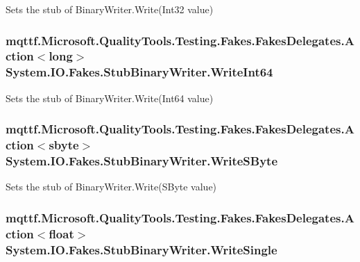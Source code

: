 Sets the stub of Binary\-Writer.\-Write(\-Int32 value)

\hypertarget{class_system_1_1_i_o_1_1_fakes_1_1_stub_binary_writer_a3ed5423f719f063820fe9f74170dd34f}{
\subsubsection[{Write\-Int64}]{\setlength{\rightskip}{0pt plus 5cm}mqttf.\-Microsoft.\-Quality\-Tools.\-Testing.\-Fakes.\-Fakes\-Delegates.\-Action$<$long$>$ System.\-I\-O.\-Fakes.\-Stub\-Binary\-Writer.\-Write\-Int64}}\label{class_system_1_1_i_o_1_1_fakes_1_1_stub_binary_writer_a3ed5423f719f063820fe9f74170dd34f}


Sets the stub of Binary\-Writer.\-Write(\-Int64 value)

\hypertarget{class_system_1_1_i_o_1_1_fakes_1_1_stub_binary_writer_a7ff1223f92522dd42e32fb2ef3104e25}{
\subsubsection[{Write\-S\-Byte}]{\setlength{\rightskip}{0pt plus 5cm}mqttf.\-Microsoft.\-Quality\-Tools.\-Testing.\-Fakes.\-Fakes\-Delegates.\-Action$<$sbyte$>$ System.\-I\-O.\-Fakes.\-Stub\-Binary\-Writer.\-Write\-S\-Byte}}\label{class_system_1_1_i_o_1_1_fakes_1_1_stub_binary_writer_a7ff1223f92522dd42e32fb2ef3104e25}


Sets the stub of Binary\-Writer.\-Write(\-S\-Byte value)

\hypertarget{class_system_1_1_i_o_1_1_fakes_1_1_stub_binary_writer_ab9d673cb3df066bb4a235bb4f3e1d367}{
\subsubsection[{Write\-Single}]{\setlength{\rightskip}{0pt plus 5cm}mqttf.\-Microsoft.\-Quality\-Tools.\-Testing.\-Fakes.\-Fakes\-Delegates.\-Action$<$float$>$ System.\-I\-O.\-Fakes.\-Stub\-Binary\-Writer.\-Write\-Single}}\label{class_system_1_1_i_o_1_1_fakes_1_1_stub_binary_writer_ab9d673cb3df066bb4a235bb4f3e1d367}


